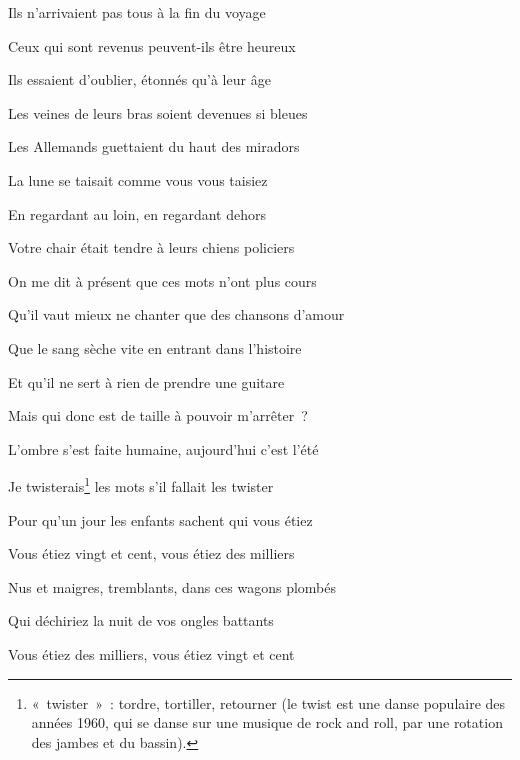 {\bigskip

Ils n'arrivaient pas tous à la fin du voyage

Ceux qui sont revenus peuvent-ils être heureux

Ils essaient d'oublier, étonnés qu'à leur âge

Les veines de leurs bras soient devenues si bleues

\bigskip

Les Allemands guettaient du haut des miradors

La lune se taisait comme vous vous taisiez

En regardant au loin, en regardant dehors

Votre chair était tendre à leurs chiens policiers

\bigskip

On me dit à présent que ces mots n'ont plus cours

Qu'il vaut mieux ne chanter que des chansons d'amour

Que le sang sèche vite en entrant dans l'histoire

Et qu'il ne sert à rien de prendre une guitare

\bigskip

Mais qui donc est de taille à pouvoir m'arrêter~?
\nopagebreak\par
L'ombre s'est faite humaine, aujourd'hui c'est l'été
\nopagebreak\par
Je twisterais\footnote{«~twister~»~: tordre, tortiller, retourner (le
twist est une danse populaire des années 1960, qui se danse sur une
musique de rock and roll, par une rotation des jambes et du bassin).}
les mots s'il fallait les twister
\nopagebreak\par
Pour qu'un jour les enfants sachent qui vous étiez

\bigskip

Vous étiez vingt et cent, vous étiez des milliers

Nus et maigres, tremblants, dans ces wagons plombés

Qui déchiriez la nuit de vos ongles battants

Vous étiez des milliers, vous étiez vingt et cent
\setlength{\parskip}{6pt}
}


